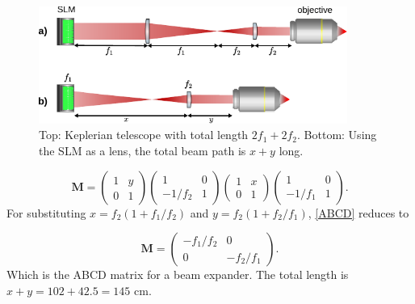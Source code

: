 \begin{figure}
	\centering
	\includegraphics[width=0.9\textwidth]{figures/beamPathSLM.pdf}
	\caption{Top: Keplerian telescope with total length $2f_1+2f_2$. Bottom: Using the SLM as a lens, the total beam path is $x+y$ long. }
	\label{SLMbeampath}
\end{figure}

\begin{equation}\label{ABCD}
	\mathbf{M}=
	\begin{pmatrix}
		1 & y \\
		0 & 1
	\end{pmatrix}
	\begin{pmatrix}
		1 & 0 \\
		-1/f_2 & 1
	\end{pmatrix}
	\begin{pmatrix}
		1 & x \\
		0 & 1
	\end{pmatrix}
	\begin{pmatrix}
		1 & 0 \\
		-1/f_1 & 1
	\end{pmatrix}.
\end{equation}
For substituting $x= f_2(1+f_1/f_2)$ and $y=f_2(1+f_2/f_1)$, \cref{ABCD} reduces to

\begin{equation}
	\mathbf{M}=
	\begin{pmatrix}
		-f_1/f_2 & 0\\
		0 & -f_2/f_1
	\end{pmatrix}.
\end{equation}
Which is the ABCD matrix for a beam expander. The total length is $x+y = 102 + 42.5 = 145$ cm.

